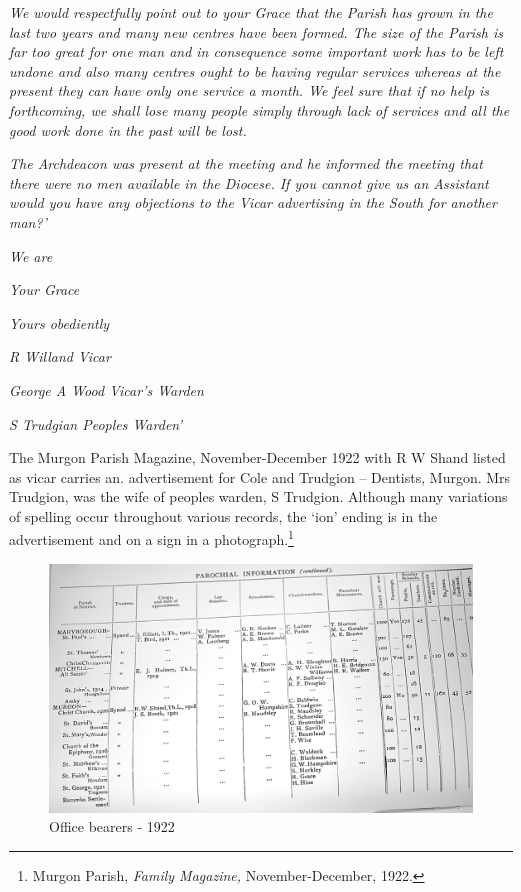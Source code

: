 \emph{We would respectfully point out to your Grace that the Parish has
grown in the last two years and many new centres have been formed. The
size of the Parish is far too great for one man and in consequence some
important work has to be left undone and also many centres ought to be
having regular services whereas at the present they can have only one
service a month. We feel sure that if no help is forthcoming, we shall
lose many people simply through lack of services and all the good work
done in the past will be lost.}

\emph{The Archdeacon was present at the meeting and he informed the
meeting that there were no men available in the Diocese. If you cannot
give us an Assistant would you have any objections to the Vicar
advertising in the South for another man?'}

\emph{We are}

\emph{Your Grace}

\emph{Yours obediently}

\emph{R Willand Vicar}

\emph{George A Wood Vicar's Warden}

\emph{S Trudgian Peoples Warden'}

The Murgon Parish Magazine, November-December 1922 with R W Shand listed
as vicar carries an. advertisement for Cole and Trudgion -- Dentists,
Murgon. Mrs Trudgion, was the wife of peoples warden, S Trudgion.
Although many variations of spelling occur throughout various records,
the `ion' ending is in the advertisement and on a sign in a
photograph.\footnote{Murgon Parish, \emph{Family Magazine,}
  November-December, 1922.}




\begin{figure}[!h]
\begin{center}
\includegraphics[width=1.\textwidth,center]{images/officeBearers1922.jpg}
\caption{ Office bearers - 1922}
\end{center}
\end{figure}


